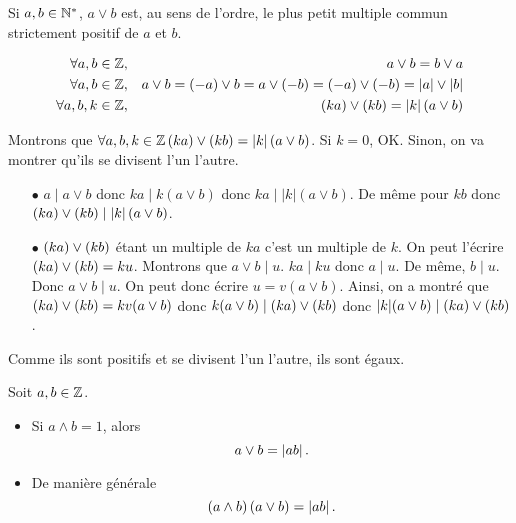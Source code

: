 \documentclass{magnolia}
\begin{document}
\begin{remarqueUnique}
  \remarque Si $a,b\in{\mathbb{N}^*}$, 
    $a\vee b$ est, au sens de l'ordre, le plus petit
    multiple commun strictement positif de $a$ et $b$.
\end{remarqueUnique}

\begin{proposition}
\begin{eqnarray*}
\forall a,b\in\mathbb{Z}, & & a\vee b=b\vee a\\
\forall a,b\in\mathbb{Z}, & &a\vee b=\left(-a\right)\vee b=a\vee\left(-b\right)=
  \left(-a\right)\vee\left(-b\right)=\left|a\right|\vee\left|b\right|\\
\forall a,b,k\in\mathbb{Z}, & & \left(ka\right)\vee\left(kb\right)=\left|k\right|\left(a\vee b\right)
\end{eqnarray*}
\end{proposition}

\begin{preuve}
Montrons que $\forall a,b,k\in\mathbb{Z}  \left(ka\right)\vee\left(kb\right)=\left|k\right|\left(a\vee b\right)$. Si $k=0$, OK. Sinon, on va montrer qu'ils se divisent l'un l'autre.
\begin{itemize}
\item[$\bullet$] $a\mid a\vee b$ donc $ka\mid k(a\vee b)$ donc $ka\mid |k|(a\vee b)$. De même pour $kb$ donc $\left(ka\right)\vee\left(kb\right)\mid \left|k\right|\left(a\vee b\right)$.
\item[$\bullet$] $\left(ka\right)\vee\left(kb\right)$ étant un multiple de $ka$ c'est un multiple de $k$. On peut l'écrire $\left(ka\right)\vee\left(kb\right)=ku$. Montrons que $a\vee b \mid u$. $ka\mid ku$ donc $a\mid u$. De même, $b\mid u$. Donc $a\vee b \mid u$. On peut donc écrire $u=v(a\vee b)$. Ainsi, on a montré que $\left(ka\right)\vee\left(kb\right)=kv(a\vee b)$ donc $k(a\vee b) \mid \left(ka\right)\vee\left(kb\right)$ donc $|k|(a\vee b) \mid \left(ka\right)\vee\left(kb\right)$.
\end{itemize}
Comme ils sont positifs et se divisent l'un l'autre, ils sont égaux.
\end{preuve}

\begin{proposition}
Soit $a,b\in\mathbb{Z}$.
\begin{itemize}
\item Si $a\wedge b=1$, alors
  \[a\vee b=\left|ab\right|.\]
\item De manière générale
  \[\left(a\wedge b\right)\left(a\vee b\right)=\left|ab\right|.\]
\end{itemize}
\end{proposition}
\end{document}
